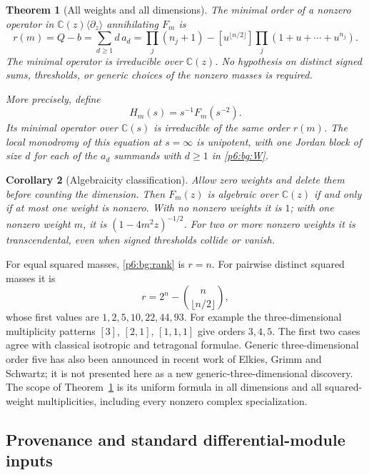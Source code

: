 \documentclass[11pt,a4paper]{article}
\newtheorem{theorem}{Theorem}[section]
\newtheorem{corollary}[theorem]{Corollary}
\theoremstyle{definition}
\theoremstyle{remark}
\numberwithin{equation}{section}
\begin{document}
\begin{theorem}[All weights and all dimensions]\label{p6:bg:main}
The minimal order of a nonzero operator in
$\mathbb C(z)\langle\partial_z\rangle$ annihilating $F_m$ is
\begin{equation}\label{p6:bg:rank}
 r(m)=Q-b=\sum_{d\ge1}d\,a_d
 =\prod_j(n_j+1)
   -[u^{\lfloor n/2\rfloor}]\prod_j(1+u+\cdots+u^{n_j}).
\end{equation}
The minimal operator is irreducible over $\mathbb C(z)$.
No hypothesis on distinct signed sums, thresholds, or generic
choices of the nonzero masses is required.

More precisely, define
\[
 H_m(s)=s^{-1}F_m(s^{-2}).
\]
Its minimal operator over $\mathbb C(s)$ is irreducible of the
same order $r(m)$.  The local monodromy of this equation at
$s=\infty$ is unipotent, with one Jordan block of size $d$ for
each of the $a_d$ summands with $d\ge1$ in \eqref{p6:bg:W}.
\end{theorem}

\begin{corollary}[Algebraicity classification]\label{p6:bg:alg}
Allow zero weights and delete them before counting the dimension.
Then $F_m(z)$ is algebraic over $\mathbb C(z)$ if and only if at
most one weight is nonzero.  With no nonzero weights it is $1$;
with one nonzero weight $m$, it is $(1-4m^2z)^{-1/2}$.
For two or more nonzero weights it is transcendental, even when
signed thresholds collide or vanish.
\end{corollary}

For equal squared masses, \eqref{p6:bg:rank} is $r=n$.
For pairwise distinct squared masses it is
\[
 r=2^n-\binom n{\lfloor n/2\rfloor},
\]
whose first values are $1,2,5,10,22,44,93$.
For example the three-dimensional multiplicity patterns
$[3]$, $[2,1]$, $[1,1,1]$ give orders $3,4,5$.
The first two cases agree with classical isotropic and tetragonal
formulae.  Generic three-dimensional order five has also been
announced in recent work of Elkies, Grimm and Schwartz; it is not
presented here as a new generic-three-dimensional discovery.
The scope of Theorem~\ref{p6:bg:main} is its uniform formula in all
dimensions and all squared-weight multiplicities, including every
nonzero complex specialization.

\subsection{Provenance and standard differential-module inputs}
\end{document}

